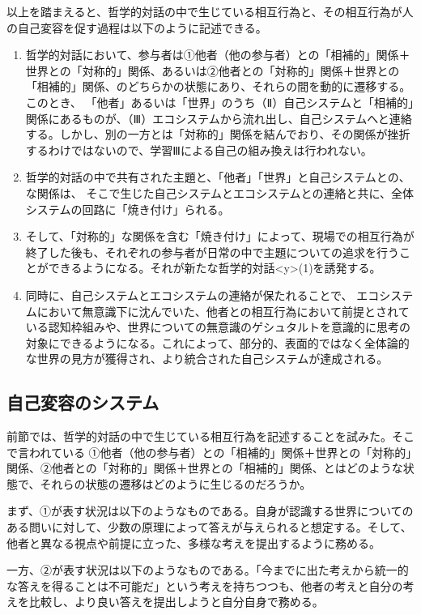 \documentclass[b5j,twoside,twocolumn]{utarticle}
\begin{document}
以上を踏まえると、哲学的対話の中で生じている相互行為と、その相互行為が人の自己変容を促す過程は以下のように記述できる。


\begin{enumerate}
\renewcommand{\labelenumi}{\pbox<y>{(\arabic{enumi})}}
\item 哲学的対話において、参与者は①他者（他の参与者）との「相補的」関係＋世界との「対称的」関係、あるいは②他者との「対称的」関係＋世界との「相補的」関係、のどちらかの状態にあり、それらの間を動的に遷移する。このとき、
「他者」あるいは「世界」のうち（Ⅱ）自己システムと「相補的」関係にあるものが、（Ⅲ）エコシステムから流れ出し、自己システムへと連絡する。しかし、別の一方とは「対称的」関係を結んでおり、その関係が挫折するわけではないので、学習Ⅲによる自己の組み換えは行われない。
\item 哲学的対話の中で共有された主題と、「他者」「世界」と自己システムとの、な関係は、
そこで生じた自己システムとエコシステムとの連絡と共に、全体システムの回路に「焼き付け」られる。
\item そして、「対称的」な関係を含む「焼き付け」によって、現場での相互行為が終了した後も、それぞれの参与者が日常の中で主題についての追求を行うことができるようになる。それが新たな哲学的対話\pbox<y>{(1)}を誘発する。
\item 同時に、自己システムとエコシステムの連絡が保たれることで、
エコシステムにおいて無意識下に沈んでいた、他者との相互行為において前提とされている認知枠組みや、世界についての無意識のゲシュタルトを意識的に思考の対象にできるようになる。これによって、部分的、表面的ではなく全体論的な世界の見方が獲得され、より統合された自己システムが達成される。
\end{enumerate}


\subsection{自己変容のシステム}
前節では、哲学的対話の中で生じている相互行為を記述することを試みた。そこで言われている
①他者（他の参与者）との「相補的」関係＋世界との「対称的」関係、②他者との「対称的」関係＋世界との「相補的」関係、とはどのような状態で、それらの状態の遷移はどのように生じるのだろうか。


まず、①が表す状況は以下のようなものである。自身が認識する世界についてのある問いに対して、少数の原理によって答えが与えられると想定する。そして、他者と異なる視点や前提に立った、多様な考えを提出するように務める。


一方、②が表す状況は以下のようなものである。「今までに出た考えから統一的な答えを得ることは不可能だ」という考えを持ちつつも、他者の考えと自分の考えを比較し、より良い答えを提出しようと自分自身で務める。
\end{document}
